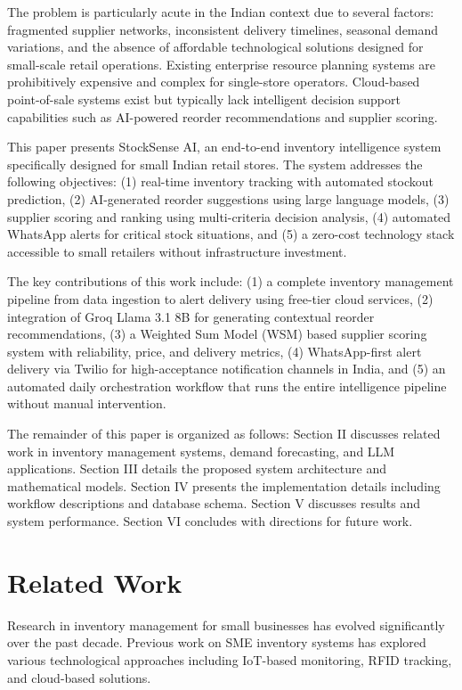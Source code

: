 \documentclass[journal]{IEEEtran}
\begin{document}
The problem is particularly acute in the Indian context due to several factors: fragmented supplier networks, inconsistent delivery timelines, seasonal demand variations, and the absence of affordable technological solutions designed for small-scale retail operations. Existing enterprise resource planning systems are prohibitively expensive and complex for single-store operators. Cloud-based point-of-sale systems exist but typically lack intelligent decision support capabilities such as AI-powered reorder recommendations and supplier scoring.

This paper presents StockSense AI, an end-to-end inventory intelligence system specifically designed for small Indian retail stores. The system addresses the following objectives: (1) real-time inventory tracking with automated stockout prediction, (2) AI-generated reorder suggestions using large language models, (3) supplier scoring and ranking using multi-criteria decision analysis, (4) automated WhatsApp alerts for critical stock situations, and (5) a zero-cost technology stack accessible to small retailers without infrastructure investment.

The key contributions of this work include: (1) a complete inventory management pipeline from data ingestion to alert delivery using free-tier cloud services, (2) integration of Groq Llama 3.1 8B for generating contextual reorder recommendations, (3) a Weighted Sum Model (WSM) based supplier scoring system with reliability, price, and delivery metrics, (4) WhatsApp-first alert delivery via Twilio for high-acceptance notification channels in India, and (5) an automated daily orchestration workflow that runs the entire intelligence pipeline without manual intervention.

The remainder of this paper is organized as follows: Section II discusses related work in inventory management systems, demand forecasting, and LLM applications. Section III details the proposed system architecture and mathematical models. Section IV presents the implementation details including workflow descriptions and database schema. Section V discusses results and system performance. Section VI concludes with directions for future work.

\section{Related Work}

Research in inventory management for small businesses has evolved significantly over the past decade. Previous work on SME inventory systems has explored various technological approaches including IoT-based monitoring, RFID tracking, and cloud-based solutions. 
\end{document}
